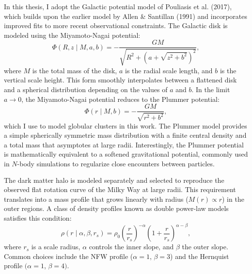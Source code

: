         In this thesis, I adopt the Galactic potential model of Pouliasis et al. (2017), which builds upon the earlier model by Allen \& Santillan (1991) and incorporates improved fits to more recent observational constraints. The Galactic disk is modeled using the Miyamoto-Nagai potential:
        \begin{equation}
            \Phi(R, z \mid M, a, b) = -\frac{G M}{\sqrt{R^2 + \left(a + \sqrt{z^2 + b^2}\right)^2}},
        \end{equation}
        where $M$ is the total mass of the disk, $a$ is the radial scale length, and $b$ is the vertical scale height. This form smoothly interpolates between a flattened disk and a spherical distribution depending on the values of $a$ and $b$. In the limit $a \to 0$, the Miyamoto-Nagai potential reduces to the Plummer potential:
        \begin{equation}
            \Phi(r \mid M, b) = -\frac{G M}{\sqrt{r^2 + b^2}},
        \end{equation}
        which I use to model globular clusters in this work. The Plummer model provides a simple spherically symmetric mass distribution with a finite central density and a total mass that asymptotes at large radii. Interestingly, the Plummer potential is mathematically equivalent to a softened gravitational potential, commonly used in $N$-body simulations to regularize close encounters between particles.

        The dark matter halo is modeled separately and selected to reproduce the observed flat rotation curve of the Milky Way at large radii. This requirement translates into a mass profile that grows linearly with radius ($M(r) \propto r$) in the outer regions. A class of density profiles known as double power-law models satisfies this condition:
        \begin{equation}
            \rho(r \mid \alpha, \beta, r_s) = \rho_0 \left( \frac{r}{r_s} \right)^{-\alpha} \left(1 + \frac{r}{r_s} \right)^{\alpha - \beta},
        \end{equation}
        where $r_s$ is a scale radius, $\alpha$ controls the inner slope, and $\beta$ the outer slope. Common choices include the NFW profile ($\alpha = 1$, $\beta = 3$) and the Hernquist profile $(\alpha = 1$, $\beta = 4)$.

